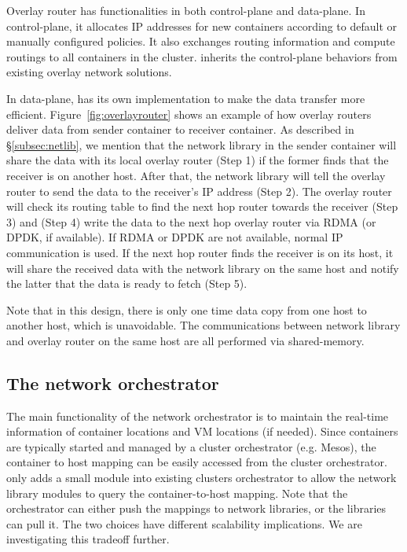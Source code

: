 Overlay router has functionalities in both control-plane and data-plane.
In control-plane, it allocates IP addresses for new containers according to
default or manually configured policies. It also exchanges routing information
and compute routings to all containers in the cluster. \sysname inherits 
the control-plane behaviors from existing overlay network solutions.

In data-plane, \sysname has its own implementation to make the data transfer
more efficient. Figure~\ref{fig:overlayrouter} shows an example of how 
overlay routers deliver data from sender container to receiver container.
As described in \S\ref{subsec:netlib}, we mention that 
the network library in the sender container will share the data with
its local overlay router (Step 1) if the former finds that the receiver 
is on another host. After that, the network library will tell
the overlay router to send the data to the receiver's IP address (Step 2).
The overlay router will check its routing table to find the next hop router
towards the receiver (Step 3) and (Step 4) write the data to the next hop overlay
router via RDMA (or DPDK, if available). If RDMA or DPDK are not available,
normal IP communication is used. If the next hop router finds the receiver is on its
host, it will share the received data with the network library on the same host
and notify the latter that the data is ready to fetch (Step 5).

Note that in this design, there is only one time data copy from one host
to another host, which is unavoidable. The communications between network library
and overlay router on the same host are all performed via shared-memory.

\subsection{The network orchestrator}

The main functionality of the network orchestrator is to maintain the real-time
information of container locations and VM locations (if needed).  Since
containers are typically started and managed by a cluster orchestrator (e.g.
Mesos), the container to host mapping can be easily accessed from the cluster
orchestrator. \sysname only adds a small module into existing clusters
orchestrator to allow the network library modules to query the container-to-host
mapping. Note that the orchestrator can either push the mappings to network
libraries, or the libraries can pull it. The two choices have different
scalability implications. We are investigating this tradeoff further.

